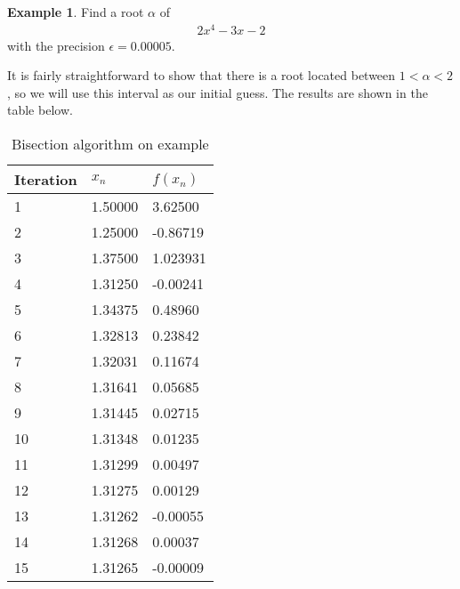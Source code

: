 \documentclass[
  digital, %
  table,   %
  nolof,     %
  nolot,     %
	draft, %
]{fithesis3}
\begin{document}
\theoremstyle{definition}
\newtheorem{example}{Example}[section]
\begin{example}
Find a root $\alpha$ of 
\begin{align}
      2x^{4} - 3x - 2
\end{align}
with the precision $\epsilon = 0.00005$.
\end{example}
It is fairly straightforward to show that there is a root located between $1 < \alpha < 2$, so we will use this interval as our initial guess. The results are shown in the table below.
\begin{table}
  \begin{tabularx}{\textwidth}{lll}
    \toprule
    Iteration & $x_{n}$ & $f(x_{n})$\\
    \midrule
    1 & 1.50000 & 3.62500 \\
    2 & 1.25000 & -0.86719 \\
    3 & 1.37500 & 1.023931 \\
    4 & 1.31250 & -0.00241 \\
    5 & 1.34375 & 0.48960 \\
    6 & 1.32813 & 0.23842 \\
    7 & 1.32031 & 0.11674 \\
    8 & 1.31641 & 0.05685 \\
    9 & 1.31445 & 0.02715 \\
    10 & 1.31348 & 0.01235 \\
    11 & 1.31299 & 0.00497 \\
    12 & 1.31275 & 0.00129 \\
    13 & 1.31262 & -0.00055 \\
    14 & 1.31268 & 0.00037 \\
    15 & 1.31265 & -0.00009 \\
    \bottomrule
  \end{tabularx}
  \caption{Bisection algorithm on example}
  \label{tab:bis}
\end{table}
\end{document}

